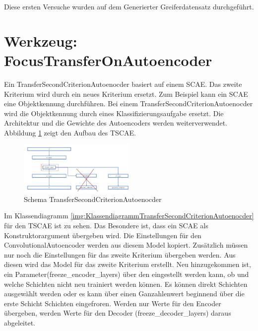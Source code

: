 	Diese ersten Versuche wurden auf dem Generierter Greiferdatensatz durchgeführt. 

	\section{Werkzeug: FocusTransferOnAutoencoder}
	\label{sec:TransferSecondCriterionAutoenocder}		
	Ein TransferSecondCriterionAutoenocder basiert auf einem SCAE. Das zweite Kriterium wird durch ein neues Kriterium ersetzt. Zum Beispiel kann ein SCAE eine Objektkennung durchführen. Bei einem TransferSecondCriterionAutoenocder wird die Objektkennung durch eines Klassifizierungsaufgabe ersetzt. Die Architektur und die Gewichte des Autoencoders werden weiterverwendet. Abbildung \ref{img:SchemaTSCAE} zeigt den Aufbau des TSCAE.
	\begin{figure}[h]
		\centering
		\includegraphics[width=0.5\textwidth, center]{bilder/Schema_Autoencoders/Schema_TSCAE.png}
		\caption[Schema TransferSecondCriterionAutoenocder]{Schema TransferSecondCriterionAutoenocder}
		\label{img:SchemaTSCAE}
	\end{figure}  
	Im Klassendiagramm \ref{img:KlassendiagrammTransferSecondCriterionAutoenocder} für den TSCAE ist zu sehen. Das Besondere ist, dass ein SCAE als Konstruktorargument übergeben wird. Die Einstellungen für den ConvolutionalAutoencoder werden aus diesem Model kopiert. Zusätzlich müssen nur noch die Einstellungen für das zweite Kriterium übergeben werden. Aus diesen wird das Model für das zweite Kriterium erstellt.
	Neu hinzugekommen ist, ein Parameter(freeze\_encoder\_layers) über den eingestellt werden kann, ob und welche Schichten nicht neu trainiert werden können. Es können direkt Schichten ausgewählt werden oder es kann über einen Ganzahlenwert beginnend über die erste Schicht Schichten eingefroren. Werden nur Werte für den Encoder übergeben, werden Werte für den Decoder (freeze\_decoder\_layers) daraus abgeleitet. 
